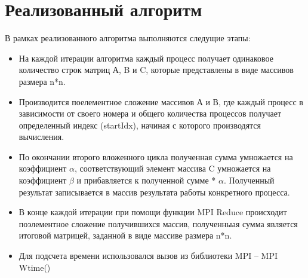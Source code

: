 \documentclass[a4paper, 16pt]{extreport}
\begin{document}
   \chapter*{Реализованный алгоритм}
   В рамках реализованного алгоритма выполняются следущие этапы:
   \begin{itemize}
	   	\item На каждой итерации алгоритма каждый процесс получает одинаковое количество строк матриц А, B и C, которые представлены в виде  массивов размера n*n.
	   	\item Производится поелементное сложение массивов А и В, где каждый процесс в зависимости от своего номера и общего количества процессов получает определенный индекс (startIdx), начиная с которого производятся вычисления.
	   	\item По окончании второго вложенного цикла полученная сумма умножается на коэффициент  $\alpha$, соответствующий элемент массива C умножается на коэффициент $\beta$ и прибавляется к полученной сумме * $\alpha$. Полученный результат записывается в массив результата работы конкретного процесса. 
	   	\item В конце каждой итерации при помощи функции MPI Reduce происходит поэлементное сложение получившихся массив, полученныая сумма является итоговой матрицей, заданной в виде массиве размера n*n.
	   	\item Для подсчета времени использовался вызов из библиотеки MPI – MPI Wtime()
    \end{itemize}
\end{document}

